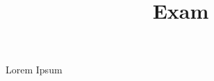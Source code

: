 \documentclass[addpoints]{exam}
\title{Exam}
\begin{document}
\maketitle
\begin{questions}
\question Lorem Ipsum
\end{questions}
\end{document}
